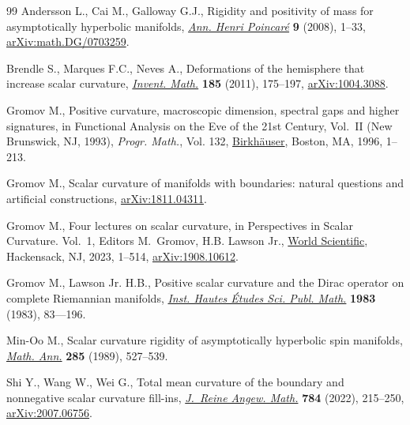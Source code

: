 \documentclass[11pt]{article}
\numberwithin{equation}{section}
\numberwithin{equation}{section}
\begin{document}
\begin{thebibliography}{99}
Andersson L., Cai M., Galloway G.J., Rigidity and positivity of mass for
  asymptotically hyperbolic manifolds, \href{https://doi.org/10.1007/s00023-007-0348-2}{\textit{Ann. Henri Poincar\'e}}
  \textbf{9} (2008), 1--33, \href{https://arxiv.org/abs/math.DG/0703259}{arXiv:math.DG/0703259}.

Brendle S., Marques F.C., Neves A., Deformations of the hemisphere that
  increase scalar curvature, \href{https://doi.org/10.1007/s00222-010-0305-4}{\textit{Invent. Math.}} \textbf{185} (2011),
  175--197, \href{https://arxiv.org/abs/1004.3088}{arXiv:1004.3088}.

Gromov M., Positive curvature, macroscopic dimension, spectral gaps and higher
  signatures, in Functional Analysis on the Eve of the 21st Century,
  {V}ol.~{II} ({N}ew {B}runswick, {NJ}, 1993), \textit{Progr. Math.}, Vol. 132,
  \href{https://doi.org/10.1007/s10107-010-0354-x}{Birkh\"auser}, Boston, MA, 1996, 1--213.

Gromov M., Scalar curvature of manifolds with boundaries: natural questions and
  artificial constructions, \href{https://arxiv.org/abs/1811.04311}{arXiv:1811.04311}.

Gromov M., Four lectures on scalar curvature, in Perspectives in Scalar
  Curvature. {V}ol.~1, Editors M.~Gromov, H.B. Lawson Jr., \href{https://doi.org/10.1007/10.1142/9789811273223_000}{World Scientific},
  Hackensack, NJ, 2023, 1--514, \href{https://arxiv.org/abs/1908.10612}{arXiv:1908.10612}.

Gromov M., Lawson Jr. H.B., Positive scalar curvature and the {D}irac operator
  on complete {R}iemannian manifolds, \href{https://doi.org/10.1007/BF02953774}{\textit{Inst. Hautes \'Etudes Sci. Publ.
  Math.}} \textbf{1983} (1983), 83---196.

Min-Oo M., Scalar curvature rigidity of asymptotically hyperbolic spin
  manifolds, \href{https://doi.org/10.1007/BF01452046}{\textit{Math. Ann.}} \textbf{285} (1989), 527--539.

Shi Y., Wang W., Wei G., Total mean curvature of the boundary and nonnegative
  scalar curvature fill-ins, \href{https://doi.org/10.1515/crelle-2021-0072}{\textit{J.~Reine Angew. Math.}} \textbf{784}
  (2022), 215--250, \href{https://arxiv.org/abs/2007.06756}{arXiv:2007.06756}.

\end{thebibliography}
\end{document}
